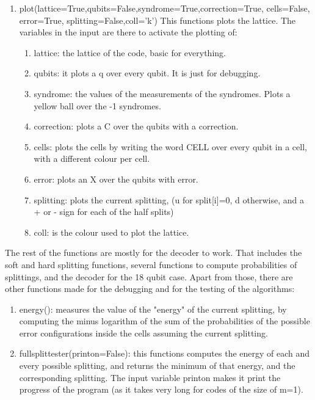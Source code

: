 \documentclass[a4paper,12pt]{article}
\begin{document}
\begin{enumerate}
\item plot(lattice=True,qubits=False,syndrome=True,correction=True, cells=False, error=True, splitting=False,coll='k') This functions plots the lattice. The variables in the input are there to activate the plotting of:
\begin{enumerate}
\item  lattice: the lattice of the code, basic for everything.
\item    qubits: it plots a q over every qubit. It is just for debugging.
\item    syndrome: the values of the measurements of the syndromes. Plots a yellow ball over the -1 syndromes.
\item    correction: plots a C over the qubits with a correction.
\item    cells: plots the cells by writing the word CELL over every qubit in a cell, with a different colour per cell.
\item    error: plots an X over the qubits with error.
\item    splitting: plots the current splitting, (u for split[i]=0, d otherwise, and a + or - sign for each of the half splits)
\item    coll: is the colour used to plot the lattice.
\end{enumerate}

\end{enumerate}

The rest of the functions are mostly for the decoder to work. That includes the soft and hard splitting functions, several functions to compute probabilities of splittings, and the decoder for the 18 qubit case. Apart from those, there are other functions made for the debugging and for the testing of the algorithms:

\begin{enumerate}
\item energy(): measures the value of the "energy" of the current splitting, by computing the minus logarithm of the sum
  of the probabilities of the possible error configurations inside the cells assuming the current splitting.

\item fullsplittester(printon=False): this functions computes the energy of each and every possible splitting, and returns
the minimum of that energy, and the corresponding splitting. The input variable printon makes it print the progress
of the program (as it takes very long for codes of the size of m=1).
\end{enumerate}
\end{document}
